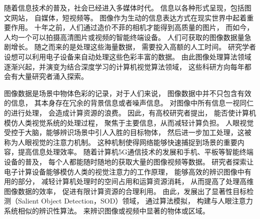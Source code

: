 



%
%
%
%
%
%
%
%
%
%
%





\label{chap:part1}


随着信息技术的普及，社会已经进入多媒体时代。
信息以各种形式呈现，包括图文网站，
自媒体，短视频等。
图像作为生动的信息表达方式在现实世界中起着重要作用。
十年之前，人们通过造价不菲的相机才能得到高质量的图片，
而如今，人均一个可以拍摄高清图片或视频的智能终端设备。
人们可获取的图像数据量急剧增长。
随之而来的是处理这些海量数据，
需要投入高额的人工时间。
研究学者设想可以利用电子设备来自动处理这些色彩丰富的数据。
由此图像处理算法领域逐渐兴起，并演变为结合深度学习的计算机视觉算法领域，
这些科研方向每年都会有大量研究者涌入探索。




图像数据是场景中物体色彩的记录，对于人们来说，
图像数据中并不只包含有效的信息，
其本身存在冗余的背景信息或者噪声信息。
对图像中所有信息一视同仁的进行处理，
会造成计算资源的浪费。
因此，有高校研究者提出，
能否使计算机模仿人类视觉系统的处理过程，
聚焦于主要信息，从而减轻计算负担。
人眼视觉受控于大脑，能够辨识场景中引人入胜的目标物体，
然后进一步加工处理，这被称为人眼视觉的注意力机制。
这种机制使得网络能够快速捕捉到场景的重要内容，提高信息处理效率。
随着计算机5G通信技术的发展和手机、平板等智能终端设备的普及，
每个人都能随时随地的获取大量的图像视频等数据。
研究者探索让电子计算设备能够模仿人类的视觉注意力的工作原理，
能够高效的辨识图像中有用的部分，
减轻计算机处理时的空间占用和运算资源消耗，
从而提高了处理高维图像数据的效率，
促进有限计算资源的合理利用。
由此，发展出了显著性目标检测（Salient Object Detection，SOD）领域，
通过算法模拟，
构建与人眼注意力系统相似的辨识性算法。
来辨识图像或视频中显著的物体或区域。





